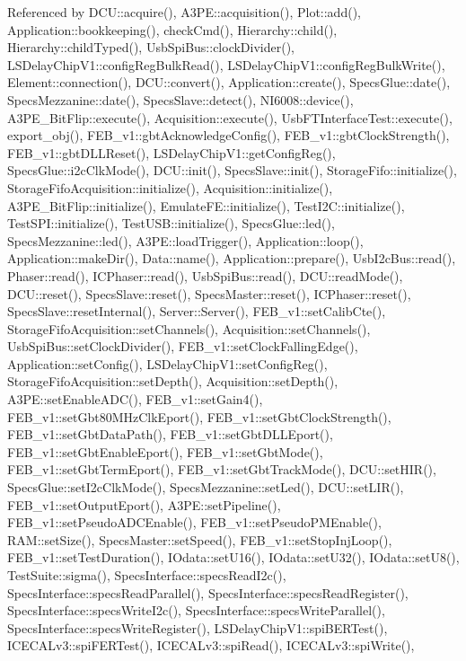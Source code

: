 Referenced by D\+C\+U\+::acquire(), A3\+P\+E\+::acquisition(), Plot\+::add(), Application\+::bookkeeping(), check\+Cmd(), Hierarchy\+::child(), Hierarchy\+::child\+Typed(), Usb\+Spi\+Bus\+::clock\+Divider(), L\+S\+Delay\+Chip\+V1\+::config\+Reg\+Bulk\+Read(), L\+S\+Delay\+Chip\+V1\+::config\+Reg\+Bulk\+Write(), Element\+::connection(), D\+C\+U\+::convert(), Application\+::create(), Specs\+Glue\+::date(), Specs\+Mezzanine\+::date(), Specs\+Slave\+::detect(), N\+I6008\+::device(), A3\+P\+E\+\_\+\+Bit\+Flip\+::execute(), Acquisition\+::execute(), Usb\+F\+T\+Interface\+Test\+::execute(), export\+\_\+obj(), F\+E\+B\+\_\+v1\+::gbt\+Acknowledge\+Config(), F\+E\+B\+\_\+v1\+::gbt\+Clock\+Strength(), F\+E\+B\+\_\+v1\+::gbt\+D\+L\+L\+Reset(), L\+S\+Delay\+Chip\+V1\+::get\+Config\+Reg(), Specs\+Glue\+::i2c\+Clk\+Mode(), D\+C\+U\+::init(), Specs\+Slave\+::init(), Storage\+Fifo\+::initialize(), Storage\+Fifo\+Acquisition\+::initialize(), Acquisition\+::initialize(), A3\+P\+E\+\_\+\+Bit\+Flip\+::initialize(), Emulate\+F\+E\+::initialize(), Test\+I2\+C\+::initialize(), Test\+S\+P\+I\+::initialize(), Test\+U\+S\+B\+::initialize(), Specs\+Glue\+::led(), Specs\+Mezzanine\+::led(), A3\+P\+E\+::load\+Trigger(), Application\+::loop(), Application\+::make\+Dir(), Data\+::name(), Application\+::prepare(), Usb\+I2c\+Bus\+::read(), Phaser\+::read(), I\+C\+Phaser\+::read(), Usb\+Spi\+Bus\+::read(), D\+C\+U\+::read\+Mode(), D\+C\+U\+::reset(), Specs\+Slave\+::reset(), Specs\+Master\+::reset(), I\+C\+Phaser\+::reset(), Specs\+Slave\+::reset\+Internal(), Server\+::\+Server(), F\+E\+B\+\_\+v1\+::set\+Calib\+Cte(), Storage\+Fifo\+Acquisition\+::set\+Channels(), Acquisition\+::set\+Channels(), Usb\+Spi\+Bus\+::set\+Clock\+Divider(), F\+E\+B\+\_\+v1\+::set\+Clock\+Falling\+Edge(), Application\+::set\+Config(), L\+S\+Delay\+Chip\+V1\+::set\+Config\+Reg(), Storage\+Fifo\+Acquisition\+::set\+Depth(), Acquisition\+::set\+Depth(), A3\+P\+E\+::set\+Enable\+A\+D\+C(), F\+E\+B\+\_\+v1\+::set\+Gain4(), F\+E\+B\+\_\+v1\+::set\+Gbt80\+M\+Hz\+Clk\+Eport(), F\+E\+B\+\_\+v1\+::set\+Gbt\+Clock\+Strength(), F\+E\+B\+\_\+v1\+::set\+Gbt\+Data\+Path(), F\+E\+B\+\_\+v1\+::set\+Gbt\+D\+L\+L\+Eport(), F\+E\+B\+\_\+v1\+::set\+Gbt\+Enable\+Eport(), F\+E\+B\+\_\+v1\+::set\+Gbt\+Mode(), F\+E\+B\+\_\+v1\+::set\+Gbt\+Term\+Eport(), F\+E\+B\+\_\+v1\+::set\+Gbt\+Track\+Mode(), D\+C\+U\+::set\+H\+I\+R(), Specs\+Glue\+::set\+I2c\+Clk\+Mode(), Specs\+Mezzanine\+::set\+Led(), D\+C\+U\+::set\+L\+I\+R(), F\+E\+B\+\_\+v1\+::set\+Output\+Eport(), A3\+P\+E\+::set\+Pipeline(), F\+E\+B\+\_\+v1\+::set\+Pseudo\+A\+D\+C\+Enable(), F\+E\+B\+\_\+v1\+::set\+Pseudo\+P\+M\+Enable(), R\+A\+M\+::set\+Size(), Specs\+Master\+::set\+Speed(), F\+E\+B\+\_\+v1\+::set\+Stop\+Inj\+Loop(), F\+E\+B\+\_\+v1\+::set\+Test\+Duration(), I\+Odata\+::set\+U16(), I\+Odata\+::set\+U32(), I\+Odata\+::set\+U8(), Test\+Suite\+::sigma(), Specs\+Interface\+::specs\+Read\+I2c(), Specs\+Interface\+::specs\+Read\+Parallel(), Specs\+Interface\+::specs\+Read\+Register(), Specs\+Interface\+::specs\+Write\+I2c(), Specs\+Interface\+::specs\+Write\+Parallel(), Specs\+Interface\+::specs\+Write\+Register(), L\+S\+Delay\+Chip\+V1\+::spi\+B\+E\+R\+Test(), I\+C\+E\+C\+A\+Lv3\+::spi\+F\+E\+R\+Test(), I\+C\+E\+C\+A\+Lv3\+::spi\+Read(), I\+C\+E\+C\+A\+Lv3\+::spi\+Write(), 